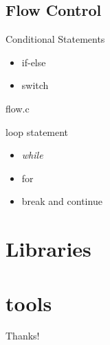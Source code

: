\documentclass[UTF8]{beamer}
\begin{document}
\subsection{Flow Control}
\begin{frame}[t]{Conditional Statements}
    \begin{itemize}
        \item if-else
        \item switch
    \end{itemize}
    flow.c
\end{frame}

\begin{frame}[t]{loop statement}
    \begin{itemize}
        \item \textit{while}
        \item for
        \item break and continue
    \end{itemize}
\end{frame}

\section{Libraries}
\section{tools}

\begin{frame}
  \centerline{\Huge{Thanks!}}
\end{frame}
\end{document}
